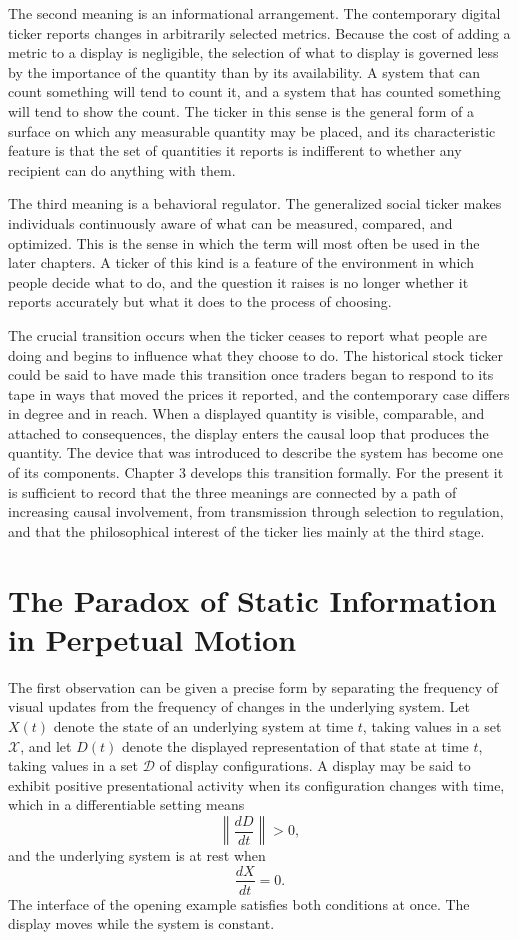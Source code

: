 \documentclass[11pt]{report}
\theoremstyle{definition}
\theoremstyle{remark}
\newcommand{\cX}{\mathcal{X}}
\begin{document}
The second meaning is an informational arrangement. The contemporary digital ticker reports changes in arbitrarily selected metrics. Because the cost of adding a metric to a display is negligible, the selection of what to display is governed less by the importance of the quantity than by its availability. A system that can count something will tend to count it, and a system that has counted something will tend to show the count. The ticker in this sense is the general form of a surface on which any measurable quantity may be placed, and its characteristic feature is that the set of quantities it reports is indifferent to whether any recipient can do anything with them.

The third meaning is a behavioral regulator. The generalized social ticker makes individuals continuously aware of what can be measured, compared, and optimized. This is the sense in which the term will most often be used in the later chapters. A ticker of this kind is a feature of the environment in which people decide what to do, and the question it raises is no longer whether it reports accurately but what it does to the process of choosing.

The crucial transition occurs when the ticker ceases to report what people are doing and begins to influence what they choose to do. The historical stock ticker could be said to have made this transition once traders began to respond to its tape in ways that moved the prices it reported, and the contemporary case differs in degree and in reach. When a displayed quantity is visible, comparable, and attached to consequences, the display enters the causal loop that produces the quantity. The device that was introduced to describe the system has become one of its components. Chapter 3 develops this transition formally. For the present it is sufficient to record that the three meanings are connected by a path of increasing causal involvement, from transmission through selection to regulation, and that the philosophical interest of the ticker lies mainly at the third stage.

\section{The Paradox of Static Information in Perpetual Motion}

The first observation can be given a precise form by separating the frequency of visual updates from the frequency of changes in the underlying system. Let $X(t)$ denote the state of an underlying system at time $t$, taking values in a set $\cX$, and let $D(t)$ denote the displayed representation of that state at time $t$, taking values in a set $\mathcal{D}$ of display configurations. A display may be said to exhibit positive presentational activity when its configuration changes with time, which in a differentiable setting means
\[
\left\|\frac{dD}{dt}\right\|>0,
\]
and the underlying system is at rest when
\[
\frac{dX}{dt}=0.
\]
The interface of the opening example satisfies both conditions at once. The display moves while the system is constant.
\end{document}
